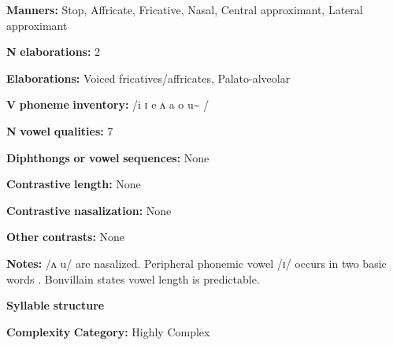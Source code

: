 \begin{styleBody}
\textbf{Manners:} Stop, Affricate, Fricative, Nasal, Central approximant, Lateral approximant
\end{styleBody}

\begin{styleBody}
\textbf{N} \textbf{elaborations:} 2
\end{styleBody}

\begin{styleBody}
\textbf{Elaborations:} Voiced fricatives/affricates, Palato-alveolar
\end{styleBody}

\begin{styleBody}
\textbf{V} \textbf{phoneme} \textbf{inventory:} /i ɪ e ʌ a o u\~{} /
\end{styleBody}

\begin{styleBody}
\textbf{N} \textbf{vowel} \textbf{qualities:} 7
\end{styleBody}

\begin{styleBody}
\textbf{Diphthongs} \textbf{or} \textbf{vowel} \textbf{sequences:} None
\end{styleBody}

\begin{styleBody}
\textbf{Contrastive} \textbf{length:} None
\end{styleBody}

\begin{styleBody}
\textbf{Contrastive} \textbf{nasalization:} None
\end{styleBody}

\begin{styleBody}
\textbf{Other} \textbf{contrasts:} None
\end{styleBody}

\begin{styleBody}
\textbf{Notes:} /ʌ u/ are nasalized. Peripheral phonemic vowel /ɪ/ occurs in two basic words \citep[43]{Bonvillain1973}. Bonvillain states vowel length is predictable.
\end{styleBody}

\begin{styleBody}
\textbf{Syllable} \textbf{structure}
\end{styleBody}

\begin{styleBody}
\textbf{Complexity} \textbf{Category:} Highly Complex
\end{styleBody}

